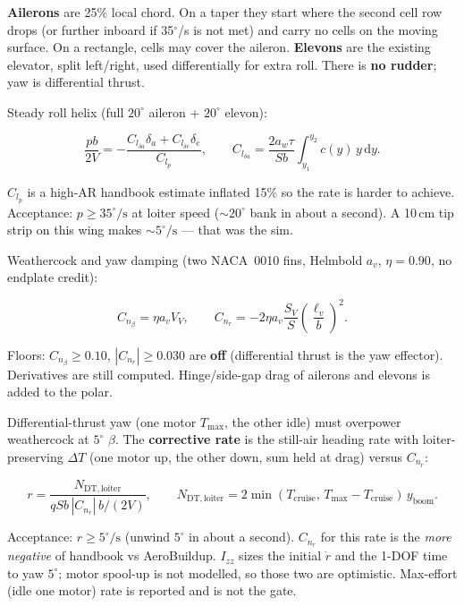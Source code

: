\documentclass[11pt,letterpaper]{article}
\begin{document}
\textbf{Ailerons} are 25\% local chord. On a taper they start where the second cell row drops (or further inboard if 35$^\circ$/s is not met) and carry no cells on the moving surface. On a rectangle, cells may cover the aileron. \textbf{Elevons} are the existing elevator, split left/right, used differentially for extra roll. There is \textbf{no rudder}; yaw is differential thrust.

Steady roll helix (full $20^\circ$ aileron + $20^\circ$ elevon):

\begin{equation}
  \frac{p b}{2V} = -\frac{C_{l_{\delta a}}\delta_a + C_{l_{\delta e}}\delta_e}{C_{l_p}},
  \qquad
  C_{l_{\delta a}} = \frac{2 a_w \tau}{S b}\int_{y_1}^{y_2} c(y)\, y\,\mathrm{d}y.
\end{equation}

$C_{l_p}$ is a high-AR handbook estimate inflated 15\% so the rate is harder to achieve. Acceptance: $p \ge 35^\circ/\mathrm{s}$ at loiter speed ($\sim 20^\circ$ bank in about a second). A 10\,cm tip strip on this wing makes $\sim 5^\circ/\mathrm{s}$ --- that was the sim.

Weathercock and yaw damping (two NACA~0010 fins, Helmbold $a_v$, $\eta=0.90$, no endplate credit):

\begin{equation}
  C_{n_\beta} = \eta a_v V_V, \qquad
  C_{n_r} = -2\eta a_v \frac{S_V}{S}\left(\frac{\ell_v}{b}\right)^2.
\end{equation}

Floors: $C_{n_\beta}\ge 0.10$, $|C_{n_r}|\ge 0.030$ are \textbf{off} (differential thrust is the yaw effector). Derivatives are still computed. Hinge/side-gap drag of ailerons and elevons is added to the polar.

Differential-thrust yaw (one motor $T_{\max}$, the other idle) must overpower weathercock at $5^\circ$ $\beta$. The \textbf{corrective rate} is the still-air heading rate with loiter-preserving $\Delta T$ (one motor up, the other down, sum held at drag) versus $C_{n_r}$:

\begin{equation}
  r = \frac{N_{\mathrm{DT,loiter}}}{q S b\, |C_{n_r}|\, b/(2V)},
  \qquad
  N_{\mathrm{DT,loiter}} = 2\min(T_{\mathrm{cruise}},\, T_{\max}-T_{\mathrm{cruise}})\, y_{\mathrm{boom}}.
\end{equation}

Acceptance: $r \ge 5^\circ/\mathrm{s}$ (unwind $5^\circ$ in about a second). $C_{n_r}$ for this rate is the \emph{more negative} of handbook vs AeroBuildup. $I_{zz}$ sizes the initial $\dot r$ and the 1-DOF time to yaw $5^\circ$; motor spool-up is not modelled, so those two are optimistic. Max-effort (idle one motor) rate is reported and is not the gate.
\end{document}
